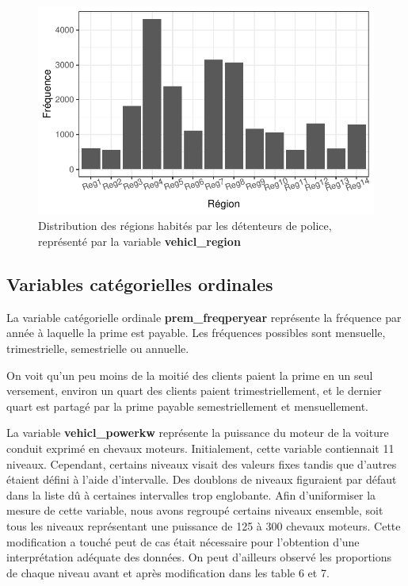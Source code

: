 \documentclass[
]{article}
\begin{document}
\begin{figure}

{\centering \includegraphics{01-Rapport_files/figure-latex/graph_vehicl_region-1} 

}

\caption{\label{fig:vehiclregion}Distribution des régions habités par les détenteurs de police, représenté par la variable \textbf{vehicl\_region}}\label{fig:graph_vehicl_region}
\end{figure}

\hypertarget{variables-catuxe9gorielles-ordinales}{%
\subsection{Variables catégorielles
ordinales}\label{variables-catuxe9gorielles-ordinales}}

La variable catégorielle ordinale \textbf{prem\_freqperyear} représente
la fréquence par année à laquelle la prime est payable. Les fréquences
possibles sont mensuelle, trimestrielle, semestrielle ou annuelle.

On voit qu'un peu moins de la moitié des clients paient la prime en un
seul versement, environ un quart des clients paient trimestriellement,
et le dernier quart est partagé par la prime payable semestriellement et
mensuellement.

La variable \textbf{vehicl\_powerkw} représente la puissance du moteur
de la voiture conduit exprimé en chevaux moteurs. Initialement, cette
variable contiennait 11 niveaux. Cependant, certains niveaux visait des
valeurs fixes tandis que d'autres étaient défini à l'aide d'intervalle.
Des doublons de niveaux figuraient par défaut dans la liste dû à
certaines intervalles trop englobante. Afin d'uniformiser la mesure de
cette variable, nous avons regroupé certains niveaux ensemble, soit tous
les niveaux représentant une puissance de 125 à 300 chevaux moteurs.
Cette modification a touché peut de cas était nécessaire pour
l'obtention d'une interprétation adéquate des données. On peut
d'ailleurs observé les proportions de chaque niveau avant et après
modification dans les table 6 et 7.
\end{document}
